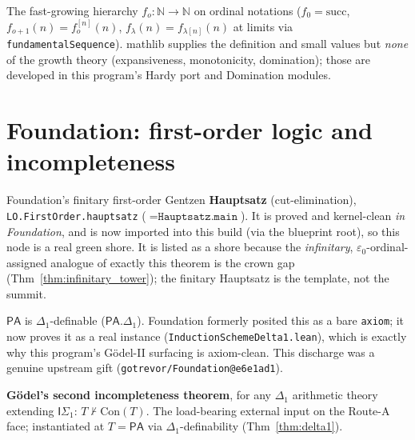 \begin{definition}\label{def:fastgrowing}
  \leanok
The fast-growing hierarchy \(f_o : \mathbb{N}\to\mathbb{N}\) on ordinal notations
(\(f_0 = \mathrm{succ}\), \(f_{o+1}(n) = f_o^{[n]}(n)\), \(f_\lambda(n) = f_{\lambda[n]}(n)\) at limits
via \texttt{fundamentalSequence}).  mathlib supplies the definition and small values but \emph{none} of
the growth theory (expansiveness, monotonicity, domination); those are developed in this program's
Hardy port and Domination modules.
\end{definition}

\section{Foundation: first-order logic and incompleteness}

\begin{theorem}\label{thm:hauptsatz}
  \leanok
Foundation's finitary first-order Gentzen \textbf{Hauptsatz} (cut-elimination), \texttt{LO.FirstOrder.hauptsatz}
(\(=\texttt{Hauptsatz.main}\)).  It is proved and kernel-clean \emph{in Foundation}, and is now imported
into this build (via the blueprint root), so this node is a real green shore.  It is
listed as a shore because the \emph{infinitary}, \(\varepsilon_0\)-ordinal-assigned analogue of exactly
this theorem is the crown gap (Thm~\ref{thm:infinitary_tower}); the finitary Hauptsatz is the template,
not the summit.
\end{theorem}

\begin{theorem}\label{thm:delta1}
  \leanok
\(\mathsf{PA}\) is \(\Delta_1\)-definable (\(\mathsf{PA}.\Delta_1\)).  Foundation formerly posited this as
a bare \texttt{axiom}; it now proves it as a real instance
(\texttt{InductionSchemeDelta1.lean}), which is exactly why this program's Gödel-II surfacing is
axiom-clean.  This discharge was a genuine upstream gift (\texttt{gotrevor/Foundation@e6e1ad1}).
\end{theorem}

\begin{theorem}\label{thm:godel2}
  \leanok
\textbf{Gödel's second incompleteness theorem}, for any \(\Delta_1\) arithmetic theory extending
\(\mathsf{I}\Sigma_1\): \(T \nvdash \mathrm{Con}(T)\).  The load-bearing external input on the Route-A
face; instantiated at \(T = \mathsf{PA}\) via \(\Delta_1\)-definability
(Thm~\ref{thm:delta1}).
\end{theorem}


